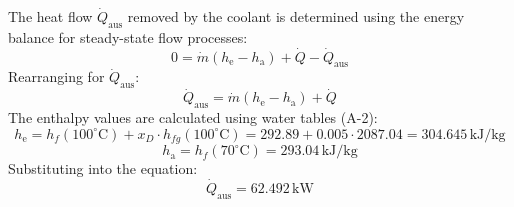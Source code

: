 The heat flow \( \dot{Q}_{\text{aus}} \) removed by the coolant is determined using the energy balance for steady-state flow processes:  
\[
0 = \dot{m} (h_{\text{e}} - h_{\text{a}}) + \dot{Q} - \dot{Q}_{\text{aus}}
\]  
Rearranging for \( \dot{Q}_{\text{aus}} \):  
\[
\dot{Q}_{\text{aus}} = \dot{m} (h_{\text{e}} - h_{\text{a}}) + \dot{Q}
\]  
The enthalpy values are calculated using water tables (A-2):  
\[
h_{\text{e}} = h_f(100^\circ\text{C}) + x_D \cdot h_{fg}(100^\circ\text{C}) = 292.89 + 0.005 \cdot 2087.04 = 304.645 \, \text{kJ/kg}
\]  
\[
h_{\text{a}} = h_f(70^\circ\text{C}) = 293.04 \, \text{kJ/kg}
\]  
Substituting into the equation:  
\[
\dot{Q}_{\text{aus}} = 62.492 \, \text{kW}
\]